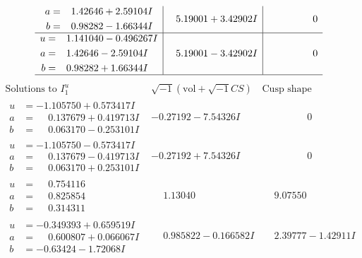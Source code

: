 \documentclass[1p]{elsarticle_modified}
\theoremstyle{definition}
\newcommand{\I}{\sqrt{-1}}
\begin{document}
$$\begin{array}{c|c|c}
\begin{aligned}
a &= \phantom{-}1.42646 + 2.59104 I \\
b &= \phantom{-}0.98282 - 1.66344 I\end{aligned}
 & \phantom{-}5.19001 + 3.42902 I & \phantom{-0.000000 } 0 \\ \hline\begin{aligned}
u &= \phantom{-}1.141040 - 0.496267 I \\
a &= \phantom{-}1.42646 - 2.59104 I \\
b &= \phantom{-}0.98282 + 1.66344 I\end{aligned}
 & \phantom{-}5.19001 - 3.42902 I & \phantom{-0.000000 } 0\\
 \hline 
 \end{array}$$\newpage$$\begin{array}{c|c|c}  
\text{Solutions to }I^u_{1}& \I (\text{vol} + \sqrt{-1}CS) & \text{Cusp shape}\\
 \hline 
\begin{aligned}
u &= -1.105750 + 0.573417 I \\
a &= \phantom{-}0.137679 + 0.419713 I \\
b &= \phantom{-}0.063170 - 0.253101 I\end{aligned}
 & -0.27192 - 7.54326 I & \phantom{-0.000000 } 0 \\ \hline\begin{aligned}
u &= -1.105750 - 0.573417 I \\
a &= \phantom{-}0.137679 - 0.419713 I \\
b &= \phantom{-}0.063170 + 0.253101 I\end{aligned}
 & -0.27192 + 7.54326 I & \phantom{-0.000000 } 0 \\ \hline\begin{aligned}
u &= \phantom{-}0.754116\phantom{ +0.000000I} \\
a &= \phantom{-}0.825854\phantom{ +0.000000I} \\
b &= \phantom{-}0.314311\phantom{ +0.000000I}\end{aligned}
 & \phantom{-}1.13040\phantom{ +0.000000I} & \phantom{-}9.07550\phantom{ +0.000000I} \\ \hline\begin{aligned}
u &= -0.349393 + 0.659519 I \\
a &= \phantom{-}0.600807 + 0.066067 I \\
b &= -0.63424 - 1.72068 I\end{aligned}
 & \phantom{-}0.985822 - 0.166582 I & \phantom{-}2.39777 - 1.42911 I \\ \hline\begin{aligned}

\end{aligned}
\end{array}$$
\end{document}

